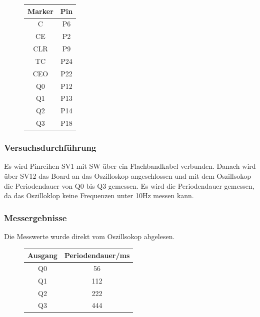 \documentclass[12pt,a4paper]{article}
\begin{document}
\begin{figure}[H]
\centering
\begin{tabular}{|c|c|}
\hline Marker & Pin \\ \hline
\hline C & P6 \\ 
\hline CE & P2 \\ 
\hline CLR & P9 \\ 
\hline TC & P24 \\ 
\hline CEO & P22 \\ 
\hline Q0 & P12 \\ 
\hline Q1 & P13 \\ 
\hline Q2 & P14 \\ 
\hline Q3 & P18 \\ 
\hline 
\end{tabular} 
\end{figure}


\subsubsection*{Versuchsdurchführung}

Es wird Pinreihen SV1 mit SW über ein Flachbandkabel verbunden. Danach wird  über SV12 das Board an das Oszilloskop angeschlossen und mit dem Oszillsokop die Periodendauer von Q0 bis Q3 gemessen. Es wird die Periodendauer gemessen, da das Oszilloklop keine Frequenzen unter 10Hz messen kann.

\subsubsection*{Messergebnisse}

Die Messwerte wurde direkt vom Oszillsokop abgelesen.

\begin{figure}[H]
\centering
\begin{tabular}{|c|c|}
\hline Ausgang & Periodendauer/ms \\ \hline
\hline Q0 & 56 \\ 
\hline Q1 & 112 \\ 
\hline Q2 & 222 \\ 
\hline Q3 & 444 \\ 
\hline 
\end{tabular}
\label{tab:periode} 
\end{figure}
\end{document}
